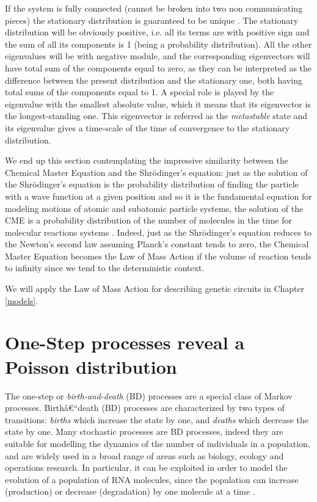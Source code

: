 \documentclass[12pt,a4paper]{report}
\begin{document}
If the system is fully connected (cannot be broken into two non communicating pieces) the stationary distribution is guaranteed to be unique \cite{PHD}. The stationary distribution will be obviously positive, i.e. all its terms are with positive sign and the sum of all its components is 1 (being a probability distribution). All the other eigenvalues will be with negative module, and the corresponding eigenvectors will have total sum of the components equal to zero, as they can be interpreted as the difference between the present distribution and the stationary one, both having total sums of the components equal to 1. A special role is played by the eigenvalue with the smallest absolute value, which it means that its eigenvector is the longest-standing one. This eigenvector is referred as the \emph{metastable} state and its eigenvalue gives a time-scale of the time of convergence to the stationary distribution.

We end up this section contemplating the impressive similarity between the Chemical Master Equation and the Shr\"{o}dinger's equation: just as the solution of the Shr\"{o}dinger's equation is the probability distribution of finding the particle with a wave function at a given position and so it is the fundamental equation for modeling motions of atomic and subatomic particle systems, the solution of the CME is a probability distribution of the number of molecules in the time for molecular reactions systems \cite{Brizi}. Indeed, just as the Shr\"{o}dinger's equation reduces to the Newton's second law assuming Planck's constant tends to zero, the Chemical Master Equation becomes the Law of Mass Action if the volume of reaction tends to infinity since we tend to the deterministic context. 

We will apply the Law of Mass Action for describing genetic circuits in Chapter \ref{models}.
     


\section{One-Step processes reveal a Poisson distribution}\label{theonestepdiscussion}
The one-step or \emph{birth-and-death} (BD) processes are a special class of Markov processes.
Birthâ€“death (BD) processes are characterized by two types of transitions: \emph{births} which increase the state by one, and \emph{deaths} which decrease the state by one. Many stochastic processes are BD processes, indeed they are suitable for modelling the dynamics of the number of individuals in a population, and are widely used in a broad range of areas such as biology, ecology and operations research. In particular, it can be exploited in order to model the evolution of a population of RNA molecules, since the population can increase (production) or decrease (degradation) by one molecule at a time \cite{onesteparticle}. 
\end{document}
